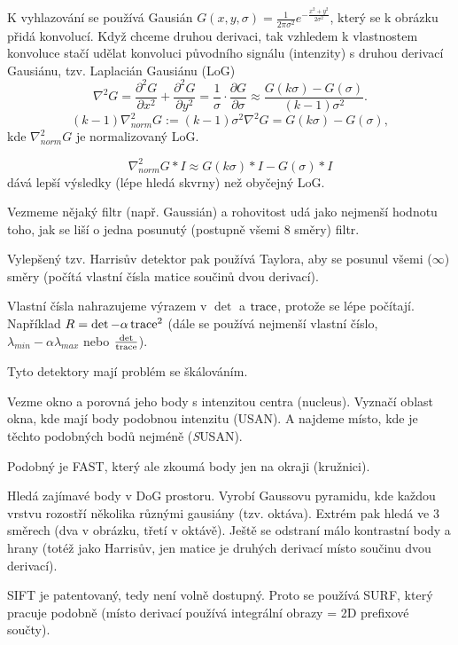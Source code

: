 \documentclass[12pt]{article}					%
\begin{document}
\begin{poznamka}[LoG]
	K vyhlazování se používá Gausián $G(x, y, \sigma) = \frac{1}{2\pi \sigma^2}e^{-\frac{x^2 + y^2}{2\sigma^2}}$, který se k obrázku přidá konvolucí. Když chceme druhou derivaci, tak vzhledem k vlastnostem konvoluce stačí udělat konvoluci původního signálu (intenzity) s druhou derivací Gausiánu, tzv. Laplacián Gausiánu (LoG)
	$$ \nabla^2 G = \frac{\partial^2 G}{\partial x^2} + \frac{\partial^2 G}{\partial y^2} = \frac{1}{\sigma}\cdot \frac{\partial G}{\partial \sigma} \approx \frac{G(k\sigma) - G(\sigma)}{(k - 1) \sigma^2}. $$
	$$ (k - 1)\nabla^2_{norm} G := (k - 1) \sigma^2 \nabla^2 G = G(k\sigma) - G(\sigma), $$
	kde $\nabla^2_{norm} G$ je normalizovaný LoG.

	$$ \nabla^2_{norm} G * I \approx G(k\sigma)*I - G(\sigma)*I $$
	dává lepší výsledky (lépe hledá skvrny) než obyčejný LoG.
\end{poznamka}

\begin{definice}
	Vezmeme nějaký filtr (např. Gaussián) a rohovitost udá jako nejmenší hodnotu toho, jak se liší o jedna posunutý (postupně všemi 8 směry) filtr.

	Vylepšený tzv. Harrisův detektor pak používá Taylora, aby se posunul všemi ($∞$) směry (počítá vlastní čísla matice součinů dvou derivací).

	Vlastní čísla nahrazujeme výrazem v $\det$ a $\operatorname{trace}$, protože se lépe počítají. Například $R = \det - \alpha \operatorname{trace}^2$ (dále se používá nejmenší vlastní číslo, $\lambda_{min} - \alpha \lambda_{max}$ nebo $\frac{\det}{\operatorname{trace}}$).

	Tyto detektory mají problém se škálováním.
\end{definice}

\begin{definice}
	Vezme okno a porovná jeho body s intenzitou centra (nucleus). Vyznačí oblast okna, kde mají body podobnou intenzitu (USAN). A najdeme místo, kde je těchto podobných bodů nejméně (\emph{S}USAN).

	Podobný je FAST, který ale zkoumá body jen na okraji (kružnici).
\end{definice}

\begin{definice}[SIFT]
	Hledá zajímavé body v DoG prostoru. Vyrobí Gaussovu pyramidu, kde každou vrstvu rozostří několika různými gausiány (tzv. oktáva). Extrém pak hledá ve 3 směrech (dva v obrázku, třetí v oktávě). Ještě se odstraní málo kontrastní body a hrany (totéž jako Harrisův, jen matice je druhých derivací místo součinu dvou derivací).

	SIFT je patentovaný, tedy není volně dostupný. Proto se používá SURF, který pracuje podobně (místo derivací používá integrální obrazy = 2D prefixové součty).
\end{definice}
\end{document}
